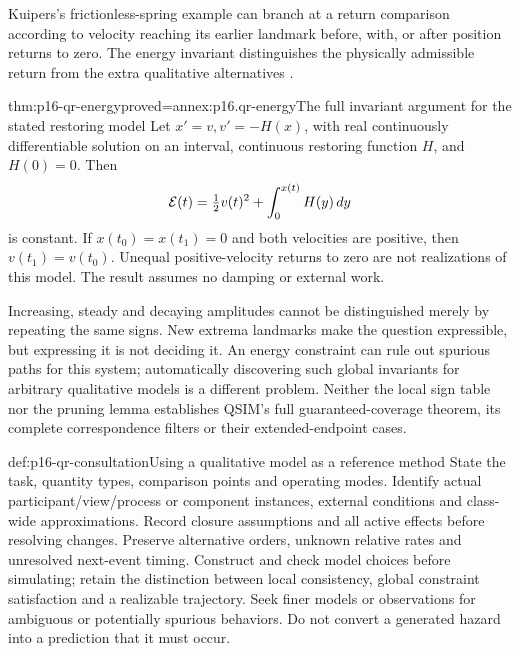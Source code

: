 Kuipers's frictionless-spring example can branch at a return comparison
according to velocity reaching its earlier landmark before, with, or after
position returns to zero. The energy invariant distinguishes the physically
admissible return from the extra qualitative alternatives
\cite[sec.~5.3]{Kuipers1986QualitativeSimulation}.

\begin{hbtheorem}{thm:p16-qr-energy}{proved=annex:p16.qr-energy}{The full invariant argument for the stated restoring model}
Let \(x'=v,v'=-H(x)\), with real continuously differentiable solution
on an interval, continuous restoring function \(H\), and \(H(0)=0\).
Then
\[
 {\cal E}(t)=\tfrac12v(t)^2+\int_0^{x(t)}H(y)\,dy
\]
is constant. If \(x(t_0)=x(t_1)=0\) and both velocities are positive,
then \(v(t_1)=v(t_0)\). Unequal positive-velocity returns to zero are
not realizations of this model. The result assumes no damping or external work.
\end{hbtheorem}

Increasing, steady and decaying amplitudes cannot be distinguished merely
by repeating the same signs. New extrema landmarks make the question
expressible, but expressing it is not deciding it. An energy constraint can
rule out spurious paths for this system; automatically discovering such
global invariants for arbitrary qualitative models is a different problem.
Neither the local sign table nor the pruning lemma establishes QSIM's full
guaranteed-coverage theorem, its complete correspondence filters or their
extended-endpoint cases.

\begin{hbmethod}{def:p16-qr-consultation}{Using a qualitative model as a reference method}
State the task, quantity types, comparison points and operating modes.
Identify actual participant/view/process or component instances, external
conditions and class-wide approximations. Record closure assumptions and
all active effects before resolving changes. Preserve alternative orders,
unknown relative rates and unresolved next-event timing. Construct and
check model choices before simulating; retain the distinction between local
consistency, global constraint satisfaction and a realizable trajectory.
Seek finer models or observations for ambiguous or potentially spurious
behaviors. Do not convert a generated hazard into a prediction that it must occur.
\end{hbmethod}

